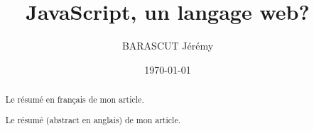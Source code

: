 \documentclass[a4paper,12pt]{report}
\title{JavaScript, un langage web?}
\author{\textsc{BARASCUT} Jérémy}
\date{\today} %
\begin{document}
 
\maketitle

\begin{abstract}
Le résumé en français de mon article.
\end{abstract}
 
\begin{abstract}
Le résumé (abstract en anglais) de mon article.
\end{abstract}


 
 
\tableofcontents

% 
















































 
 
\listoftables
\printindex
\end{document}
